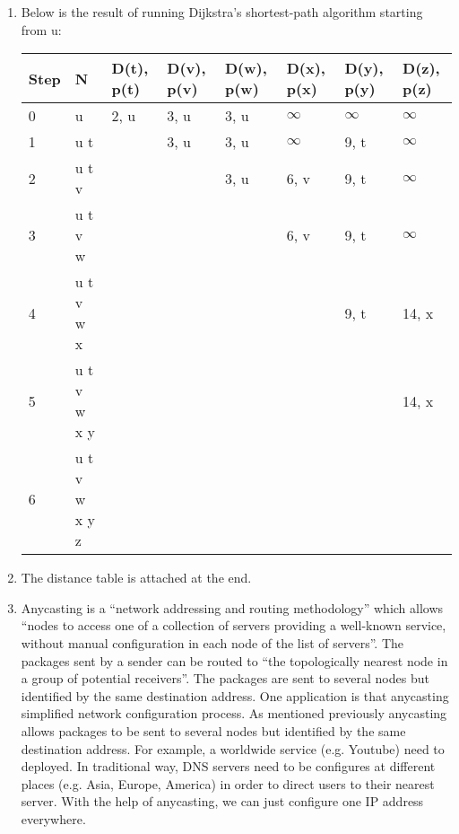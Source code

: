 \documentclass[12pt]{article}
\begin{document}
\begin{singlespace}
\begin{enumerate}
\item
	Below is the result of running Dijkstra's shortest-path algorithm starting from u:
	\begin{table}[h]
		\centering
		\label{my-label}
		\begin{tabular}{|l|l|l|l|l|l|l|l|}
		\hline
		Step & N             & D(t), p(t) & D(v), p(v) & D(w), p(w) & D(x), p(x) & D(y), p(y) & D(z), p(z) \\ \hline
		0    & u             & 2, u       & 3, u       & 3, u       & $\infty$   & $\infty$   & $\infty$   \\ \hline
		1    & u t           &            & 3, u       & 3, u       & $\infty$   & 9, t       & $\infty$   \\ \hline
		2    & u t v         &            &            & 3, u       & 6, v       & 9, t       & $\infty$   \\ \hline
		3    & u t v w       &            &            &            & 6, v       & 9, t       & $\infty$   \\ \hline
		4    & u t v w x     &            &            &            &            & 9, t       & 14, x      \\ \hline
		5    & u t v w x y   &            &            &            &            &            & 14, x      \\ \hline
		6    & u t v w x y z &            &            &            &            &            &            \\ \hline
		\end{tabular}
	\end{table}
\item The distance table is attached at the end.
\item
	Anycasting is a ``network addressing and routing methodology'' which allows ``nodes to access one of a collection of servers providing a well-known service, without manual configuration in each node of the list of servers''. The packages sent by a sender can be routed to ``the topologically nearest node in a group of potential receivers''. The packages are sent to several nodes but identified by the same destination address. One application is that anycasting simplified network configuration process. As mentioned previously anycasting allows packages to be sent to several nodes but identified by the same destination address. For example, a worldwide service (e.g. Youtube) need to deployed. In traditional way, DNS servers need to be configures at different places (e.g. Asia, Europe, America) in order to direct users to their nearest server. With the help of anycasting, we can just configure one IP address everywhere.

\end{enumerate}
\end{singlespace}
\end{document}

